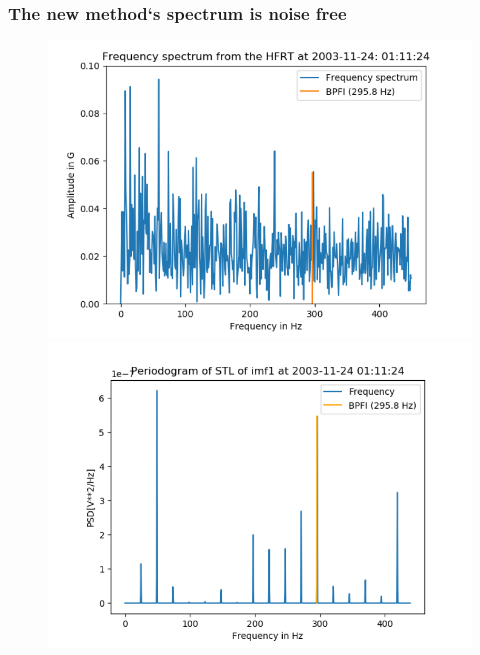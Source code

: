 \documentclass{beamer}
\begin{document}




\begin{frame}
	\frametitle{The new method`s spectrum is noise free    }
	\begin{figure}[H]
		\centering
		\includegraphics[width=0.5\linewidth]{method1}
		\includegraphics[width=0.5\linewidth]{method2}
	\end{figure}
\end{frame}

\end{document}
